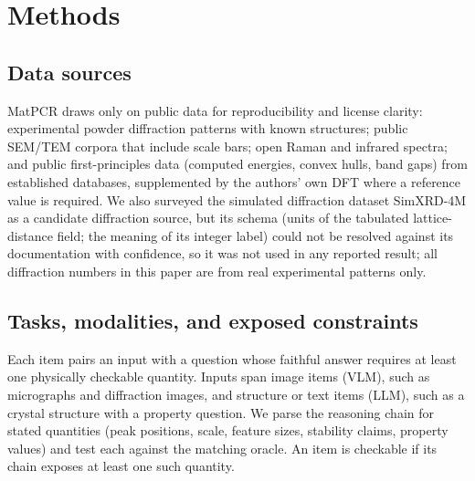 \documentclass[pdflatex,sn-nature]{sn-jnl}
\begin{document}
\section*{Methods}
\subsection*{Data sources}
MatPCR draws only on public data for reproducibility and license clarity: experimental
powder diffraction patterns with known structures;\cite{opxrd2025} public SEM/TEM corpora
that include scale bars;\cite{aversa2018nffa} open Raman and infrared
spectra;\cite{lafuente2015rruff} and public first-principles data (computed energies,
convex hulls, band gaps) from established databases,\cite{matproj2013} supplemented by
the authors' own DFT where a reference value is required. We also surveyed the simulated
diffraction dataset SimXRD-4M\cite{simxrd2024} as a candidate diffraction source, but its
schema (units of the tabulated lattice-distance field; the meaning of its integer label)
could not be resolved against its documentation with confidence, so it was not used in
any reported result; all diffraction numbers in this paper are from real experimental
patterns only.

\subsection*{Tasks, modalities, and exposed constraints}
Each item pairs an input with a question whose faithful answer requires at least one
physically checkable quantity. Inputs span image items (VLM), such as micrographs and
diffraction images, and structure or text items (LLM), such as a crystal structure
with a property question. We parse the reasoning chain for stated quantities (peak
positions, scale, feature sizes, stability claims, property values) and test each
against the matching oracle. An item is checkable if its chain exposes at least one
such quantity.
\end{document}
